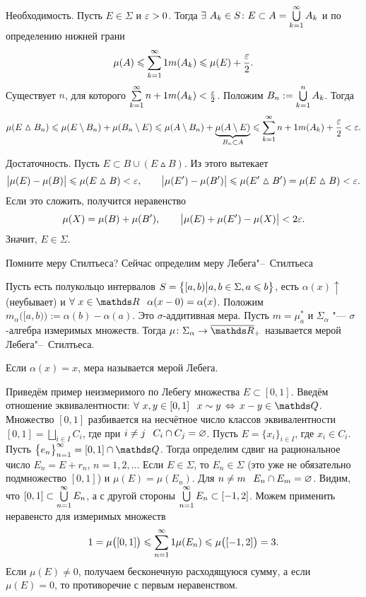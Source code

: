\begin{Proof}
  Необходимость. Пусть $E\in\Sigma$ и $\varepsilon>0$. Тогда $\exists\ A_k\in S\colon E\subset A = \bigcup\limits_{k=1}^\infty A_k$ и по определению нижней грани
\[\mu(A)\leqslant \sum\limits_{{k}={1}}^\infty1 m(A_k)\leqslant \mu(E)+\frac{\varepsilon}2.\]
Существует $n$, для которого $\sum\limits_{{k}={1}}^\infty{n+1} m(A_k)<\frac{\varepsilon}2$. Положим $B_n:=\bigcup\limits_{k=1}^{n} A_k$. Тогда
\[\mu (E\vartriangle B_n)\leqslant \mu(E\setminus B_n)+\mu(B_n\setminus E)\leqslant \mu(A\setminus B_n) + \underbrace{\mu(A\setminus E)}_{B_n\subset A}\leqslant \sum\limits_{{k}={1}}^\infty{n+1}m(A_k)+\frac{\varepsilon}2<\varepsilon.\]

  Достаточность. Пусть $E\subset B\cup (E\vartriangle B)$. Из этого вытекает
\[\big|\mu(E)-\mu(B)\big|\leqslant \mu(E\vartriangle B)<\varepsilon,\qquad 
  \big|\mu(E')-\mu(B')\big|\leqslant \mu(E'\vartriangle B')=\mu(E\vartriangle B)<\varepsilon.\]
  Если это сложить, получится неравенство
\[ \mu(X)=\mu(B)+\mu(B'),\qquad \big|\mu(E)+\mu(E')-\mu(X)\big|<2\varepsilon.\]
 Значит, $E\in\Sigma$.
\end{Proof}

Помните меру Стилтьеса? Сейчас определим меру Лебега"--~Стилтьеса
\begin{Def}
 Пусть есть полукольцо интервалов $S=\big\{[a,b)\big|a,b\in\Sigma,a\leqslant b\big\}$, есть $\alpha(x)\uparrow$ (неубывает) и $\forall\ x\in\R\pau \alpha(x-0)\hm=\alpha(x)$. Положим $m_\alpha\big([a,b)\big):=\alpha(b)-\alpha(a)$. Это $\sigma$-аддитивная мера. Пусть $m=\mu_a^*$ и $\Sigma_\alpha$ "--- $\sigma$-алгебра измеримых множеств. Тогда $\mu\colon \Sigma_\alpha\to\ol\R_+$ называется мерой Лебега"--~Стилтьеса.
\end{Def}

Если $\alpha(x) = x$, мера называется мерой Лебега.

Приведём пример неизмеримого по Лебегу множества $E\subset [0,1]$. Введём отношение эквивалентности: $\forall\ x,y\in[0,1]\pau x\sim y\iff x-y\in\Q$. Множество $[0,1]$ разбивается на несчётное число классов эквивалентности $[0,1] = \bigsqcup\limits_{i\in I}C_i$, где при $i\ne j\pau C_i\cap C_j=\q$. Пусть $E = \big\{x_i\big\}_{i\in I}$, где $x_i\in C_i$. Пусть $\big\{e_n\big\}_{n=1}^\infty = [0,1]\cap\Q$. Тогда определим сдвиг на рациональное число $E_n = E + r_n$, $n=1,2,\ldots$ Если $E\in\Sigma$, то $E_n\in\Sigma$ (это уже не обязательно подмножество $[0,1]$) и $\mu(E)=\mu(E_n)$. Для $n\ne m\pau E_n\cap E_m=\q$. Видим, что $[0,1]\subset \bigcup\limits_{n=1}^\infty E_n$, а с другой стороны $\bigcup\limits_{n=1}^\infty E_n\subset [-1,2]$. Можем применить неравенсто для измеримых множеств
\[1 = \mu\big([0,1]\big)\leqslant \sum\limits_{{n}={1}}^\infty1\mu(E_n)\leqslant \mu\big([-1,2]\big) = 3.\]
Если $\mu (E)\ne 0$, получаем бесконечную расходящуюся сумму, а если $\mu(E)=0$, то противоречие с первым неравенством.

